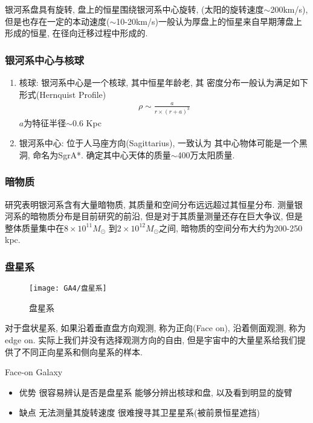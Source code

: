 银河系盘具有旋转, 盘上的恒星围绕银河系中心旋转, (太阳的旋转速度$\sim$200km/s), 但是也存在一定的本动速度($\sim$10-20km/s)一般认为厚盘上的恒星来自早期薄盘上形成的恒星, 在径向迁移过程中形成的. 

\subsubsection{银河系中心与核球}
\begin{enumerate}\small
    \item 核球: 银河系中心是一个核球, 其中恒星年龄老, 其
    密度分布一般认为满足如下形式(Hernquist Profile)
    \begin{align*}
        \rho \sim \frac{a}{r\times(r+a)^3}
    \end{align*}
    $a$为特征半径$\sim$0.6 Kpc
    \item 银河系中心: 位于人马座方向(Sagittarius), 一致认为
    其中心物体可能是一个黑洞, 命名为SgrA*. 确定其中心天体的质量$\sim$400万太阳质量. 
\end{enumerate}

\subsubsection{暗物质}
研究表明银河系含有大量暗物质, 其质量和空间分布远远超过其恒星分布. 测量银河系的暗物质分布是目前研究的前沿, 但是对于其质量测量还存在巨大争议, 但是整体质量集中在$8\times 10^{11} M_{\odot}$ 到$2\times 10^{12} M_{\odot}$之间, 暗物质的空间分布大约为200-250 kpc. 

\subsubsection{盘星系}

\begin{figure}[!htb]
    \centering
    \texttt{[image: GA4/盘星系]}
    \caption{盘星系}
\end{figure}

对于盘状星系, 如果沿着垂直盘方向观测, 称为正向(Face on), 沿着侧面观测, 称为edge on. 实际上我们并没有选择观测方向的自由, 但是宇宙中的大量星系给我们提供了不同正向星系和侧向星系的样本. 

Face-on Galaxy
\begin{itemize}\small
    \item 优势
    \subitem 很容易辨认是否是盘星系
    \subitem 能够分辨出核球和盘, 以及看到明显的旋臂
    \item 缺点
    \subitem 无法测量其旋转速度
    \subitem 很难搜寻其卫星星系(被前景恒星遮挡)
\end{itemize}

